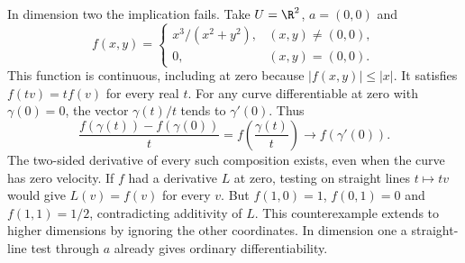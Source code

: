 In dimension two the implication fails. Take $U=\R^2$, $a=(0,0)$ and
\[
 f(x,y)=\begin{cases}x^3/(x^2+y^2),&(x,y)\ne(0,0),\\0,&(x,y)=(0,0).\end{cases}
\]
This function is continuous, including at zero because $|f(x,y)|\le |x|$. It satisfies $f(tv)=t f(v)$ for every real $t$. For any curve differentiable at zero with $\gamma(0)=0$, the vector $\gamma(t)/t$ tends to $\gamma'(0)$. Thus
\[
 \frac{f(\gamma(t))-f(\gamma(0))}{t}
 =f\left(\frac{\gamma(t)}{t}\right)\longrightarrow f(\gamma'(0)).
\]
The two-sided derivative of every such composition exists, even when the curve has zero velocity. If $f$ had a derivative $L$ at zero, testing on straight lines $t\mapsto tv$ would give $L(v)=f(v)$ for every $v$. But $f(1,0)=1$, $f(0,1)=0$ and $f(1,1)=1/2$, contradicting additivity of $L$. This counterexample extends to higher dimensions by ignoring the other coordinates. In dimension one a straight-line test through $a$ already gives ordinary differentiability.
